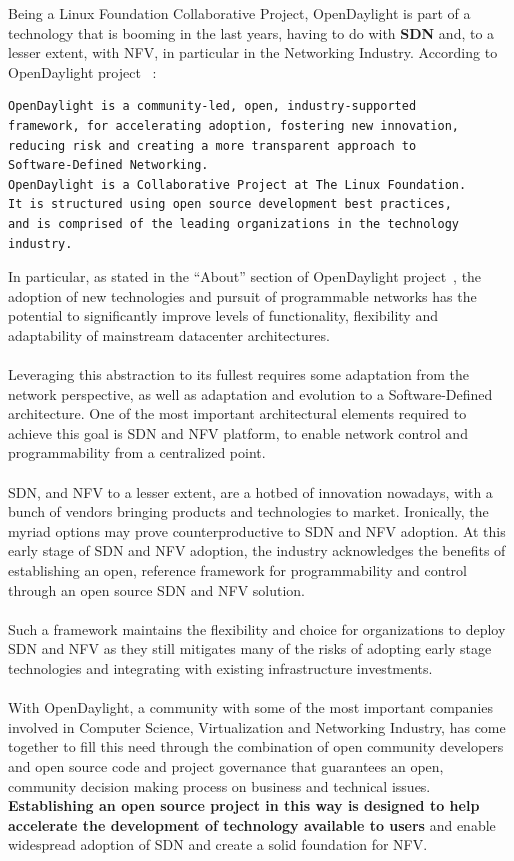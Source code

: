 \documentclass[a4paper, 12pt]{book}
\begin{document}
Being a Linux Foundation Collaborative Project, OpenDaylight is part of a technology that is booming in the last years, having to do with \textbf{SDN} and, to a lesser extent, with NFV, in particular in the Networking Industry. According to OpenDaylight project ~\cite{OpenDaylightTheProject}:
\begin{verbatim}
OpenDaylight is a community-led, open, industry-supported
framework, for accelerating adoption, fostering new innovation,
reducing risk and creating a more transparent approach to
Software-Defined Networking.
OpenDaylight is a Collaborative Project at The Linux Foundation.
It is structured using open source development best practices,
and is comprised of the leading organizations in the technology
industry.
\end{verbatim}
In particular, as stated in the ``About'' section of OpenDaylight project~\cite{OpenDaylightAbout}, the adoption of new technologies and pursuit of programmable networks has the potential to significantly improve levels of functionality, flexibility and adaptability of mainstream datacenter architectures.\\
\\
Leveraging this abstraction to its fullest requires some adaptation from the network perspective, as well as adaptation and evolution to a Software-Defined architecture. One of the most important architectural elements required to achieve this goal is SDN and NFV platform, to enable network control and programmability from a centralized point.\\
\\
SDN, and NFV to a lesser extent, are a hotbed of innovation nowadays, with a bunch of vendors bringing products and technologies to market. Ironically, the myriad options may prove counterproductive to SDN and NFV adoption. At this early stage of SDN and NFV adoption, the industry acknowledges the benefits of establishing an open, reference framework for programmability and control through an open source SDN and NFV solution.\\
\\
Such a framework maintains the flexibility and choice for organizations to deploy SDN and NFV as they still mitigates many of the risks of adopting early stage technologies and integrating with existing infrastructure investments.\\
\\
With OpenDaylight, a community with some of the most important companies involved in Computer Science, Virtualization and Networking Industry, has come together to fill this need through the combination of open community developers and open source code and project governance that guarantees an open, community decision making process on business and technical issues. \textbf{Establishing an open source project in this way is designed to help accelerate the development of technology available to users} and enable widespread adoption of SDN and create a solid foundation for NFV.\\
\end{document}
